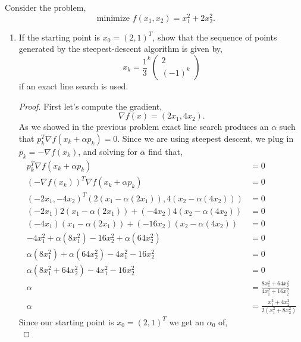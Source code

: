 \documentclass[12pt]{article}
\makeatletter
\theoremstyle{homework}
\newenvironment{exercise}[1]
{\def\@currentlabel{#1}\exercisecore}
{\endexercisecore}
\makeatother
\begin{document}
\begin{exercise}{2.3} Consider the problem, 
  \begin{equation*}
    \text{ minimize } f(x_1, x_2) = x_1^2 + 2x_2^2.
  \end{equation*}
  \begin{enumerate}
    \item[(i)] If the starting point is $x_0 = (2, 1)^T$, show that the sequence of points generated by the steepest-descent algorithm is given by, 
    \begin{equation*}
      x_k = \frac{1}{3}^k \begin{pmatrix}
        2\\
        (-1)^k
      \end{pmatrix}
    \end{equation*}
    if an exact line search is used. 
    \begin{proof}First let's compute the gradient, 
      \begin{equation*}
        \nabla f(x) = (2x_1,  4x_2).
      \end{equation*}
      As we showed in the previous problem exact line search produces an $\alpha$ such that $p_k^T\nabla f(x_k + \alpha p_k) = 0$. 
      Since we are using steepest descent, we plug in $p_k = -\nabla f(x_k)$, and solving for $\alpha$ find that, 
      \begin{align*}
        p_k^T\nabla f(x_k + \alpha p_k) &= 0\\
        (-\nabla f(x_k))^T\nabla f(x_k + \alpha p_k) &= 0\\
        (-2x_1,  -4x_2)^T(2(x_1 - \alpha(2x_1)), 4(x_2 - \alpha(4x_2))) &= 0\\
        (-2x_1)2(x_1 - \alpha(2x_1)) + (-4x_2)4(x_2 - \alpha(4x_2)) &= 0\\
        (-4x_1)(x_1 - \alpha(2x_1)) + (-16x_2)(x_2 - \alpha(4x_2)) &= 0\\
        -4x_1^2 + \alpha(8x_1^2) - 16x_2^2 + \alpha(64x_2^2) &= 0\\
        \alpha(8x_1^2) + \alpha(64x_2^2) - 4x_1^2 - 16x_2^2  &= 0\\
        \alpha(8x_1^2 + 64x_2^2) - 4x_1^2 - 16x_2^2  &= 0\\
        \alpha  &= \frac{8x_1^2 + 64x_2^2}{4x_1^2 +16x_2^2}\\
        \alpha  &= \frac{x_1^2 + 4x_2^2}{2(x_1^2 + 8x_2^2)}
      \end{align*}
      Since our starting point is $x_0 = (2, 1)^T$ we get an $\alpha_0$ of, 
      \begin{equation*}

\end{equation*}
\end{proof}
\end{enumerate}
\end{exercise}
\end{document}
